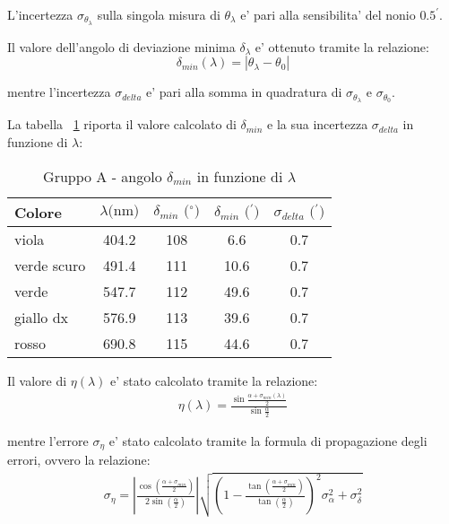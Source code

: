 L'incertezza $\sigma_{\theta_{\lambda}}$ sulla singola misura di $\theta_{\lambda}$ e' pari alla sensibilita' del nonio $0.5^{\prime}$.

Il valore dell'angolo di deviazione minima $\delta_{\lambda}$ e' ottenuto tramite la relazione:
\[
    \delta_{min} (\lambda) = |\theta_{\lambda} - \theta_0|
\]

mentre l'incertezza $\sigma_{delta}$ e' pari alla somma in quadratura di $\sigma_{\theta_{\lambda}}$ e $\sigma_{\theta_0}$.

La tabella ~\ref{table:tbl5} riporta il valore calcolato di $\delta_{min}$ e la sua incertezza $\sigma_{delta}$ in funzione di $\lambda$:
\begin{table}[!htbp]
    {\par\centering
    \begin{tabular}{lcccc}
        \hline
            Colore&
            $\lambda \text{(nm)}$ & 
            $\delta_{min} \text{ ($^{\circ}$)}$ & 
            $\delta_{min} \text{ ($^{\prime}$)}$ & 
            $\sigma_{delta} \text{ ($^{\prime}$)}$\\
        \hline
            viola       &   404.2   &   108 &   6.6  & 0.7\\
            verde scuro &   491.4   &   111 &   10.6 & 0.7\\
            verde       &   547.7   &   112 &   49.6 & 0.7\\
            giallo dx   &   576.9   &   113 &   39.6 & 0.7\\
            rosso       &   690.8   &   115 &   44.6 & 0.7\\
        \hline
    \end{tabular}
    \par}
    \caption{Gruppo A - angolo $\delta_{min}$ in funzione di $\lambda$} \label{table:tbl5}
\end{table}

Il valore di $\eta (\lambda)$ e' stato calcolato tramite la relazione:
\begin{align}
    \eta (\lambda) = \frac{\sin{\frac{\alpha + \sigma_{min} (\lambda)}{2}}}{\sin{\frac{\alpha}{2}}}
\end{align}

mentre l'errore $\sigma_{\eta}$ e' stato calcolato tramite la formula di propagazione degli errori, ovvero la relazione:
\begin{align}
    \sigma_{\eta} = 
        \left|
            \frac{
                \cos{\left( \frac{\alpha + \sigma_{min}}{2} \right)}
            }{
                2 \sin{\left( \frac{\alpha}{2} \right)}
            }
        \right|
        \sqrt{
            \left(
                1-\frac{
                    \tan{\left(
                        \frac{\alpha + \sigma_{min}}{2}
                    \right)
                }}{
                \tan{\left(
                    \frac{\alpha}{2}
                \right)}}
            \right)^2 \sigma_{\alpha}^2 + \sigma_{\delta}^2}
\end{align}

